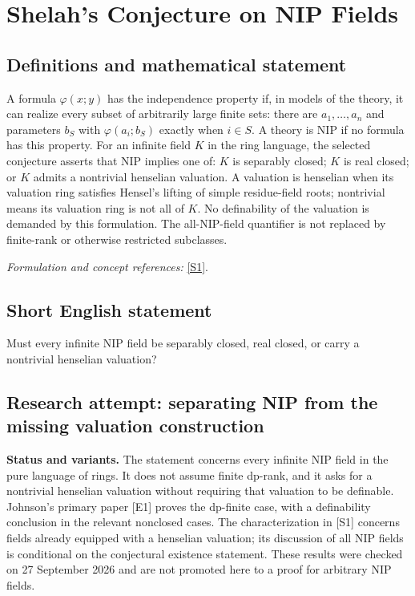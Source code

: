 \documentclass[11pt]{article}
\begin{document}
\section*{\texorpdfstring{Shelah's Conjecture on NIP Fields}{Shelah's Conjecture on NIP Fields}}\label{30006870}
\subsection{Definitions and mathematical statement}
A formula $\varphi(x;y)$ has the independence property if, in models of the theory, it can realize every subset of arbitrarily large finite sets: there are $a_1,\ldots,a_n$ and parameters $b_S$ with $\varphi(a_i;b_S)$ exactly when $i\in S$. A theory is NIP if no formula has this property. For an infinite field $K$ in the ring language, the selected conjecture asserts that NIP implies one of: $K$ is separably closed; $K$ is real closed; or $K$ admits a nontrivial henselian valuation. A valuation is henselian when its valuation ring satisfies Hensel's lifting of simple residue-field roots; nontrivial means its valuation ring is not all of $K$. No definability of the valuation is demanded by this formulation. The all-NIP-field quantifier is not replaced by finite-rank or otherwise restricted subclasses.
\par\smallskip\textit{Formulation and concept references:} \href{https://arxiv.org/abs/1911.00309}{[S1]}.

\subsection{Short English statement}
Must every infinite NIP field be separably closed, real closed, or carry a nontrivial henselian valuation?
\subsection{Research attempt: separating NIP from the missing valuation construction}
\textbf{Status and variants.} The statement concerns every infinite NIP field in the pure language of rings. It does not assume finite dp-rank, and it asks for a nontrivial henselian valuation without requiring that valuation to be definable. Johnson's primary paper [E1] proves the dp-finite case, with a definability conclusion in the relevant nonclosed cases. The characterization in [S1] concerns fields already equipped with a henselian valuation; its discussion of all NIP fields is conditional on the conjectural existence statement. These results were checked on 27 September 2026 and are not promoted here to a proof for arbitrary NIP fields.
\end{document}
